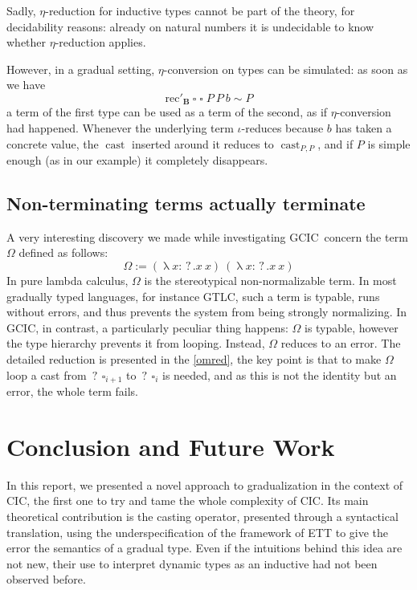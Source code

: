 \documentclass[en]{myarticle}
\renewcommand{\mathtt}{\mathrm}
\newcommand{\uni}[1][]{\square_{#1}}
\newcommand{\cons}{\sim}
\DeclareMathOperator{\?}{?}
\renewcommand{\l}{\operatorname{\lambda}}
\newcommand{\rec}{\mathtt{rec}}
\newcommand{\bool}{\mathbf{B}}
\newcommand{\cas}{\operatorname{\mathtt{cast}}}
\newcommand{\cast}[3]{\cas_{#1,#2}#3}
\newcommand{\gcic}{GCIC}
\begin{document}
{Sadly, $\eta$-reduction for inductive types cannot be part of the theory, for decidability reasons: already on natural numbers it is undecidable to know whether $\eta$-reduction applies.

However, in a gradual setting, $\eta$-conversion on types can be simulated: as soon as we have
\[\rec'_{\bool}~\uni~\uni~P~P~b \cons P \]
a term of the first type can be used as a term of the second, as if $\eta$-conversion had happened. Whenever the underlying term $\iota$-reduces because $b$ has taken a concrete value, the $\cas$ inserted around it reduces to $\cast{P}{P}{}$, and if $P$ is simple enough (as in our example) it completely disappears.

\subsection{Non-terminating terms actually terminate}
\label{omexs}

A very interesting discovery we made while investigating \gcic\ concern the term $\Omega$ defined as follows:
\[\Omega := (\l x : \? . x~x)~(\l x : \? . x~x) \]
In pure lambda calculus, $\Omega$ is the stereotypical non-normalizable term. In most gradually typed languages, for instance GTLC, such a term is typable, runs without errors, and thus prevents the system from being strongly normalizing. In \gcic, in contrast, a particularly peculiar thing happens: $\Omega$ is typable, however the type hierarchy prevents it from looping. Instead, $\Omega$ reduces to an error. The detailed reduction is presented in the \autoref{omred}, the key point is that to make $\Omega$ loop a cast from $\?~\uni[i+1]$ to $\?~\uni[i]$ is needed, and as this is not the identity but an error, the whole term fails.

\section*{Conclusion and Future Work}

In this report, we presented a novel approach to gradualization in the context of CIC, the first one to try and tame the whole complexity of CIC. Its main theoretical contribution is the casting operator, presented through a syntactical translation, using the underspecification of the framework of ETT to give the error the semantics of a gradual type. Even if the intuitions behind this idea are not new, their use to interpret dynamic types as an inductive had not been observed before.

}
\end{document}
